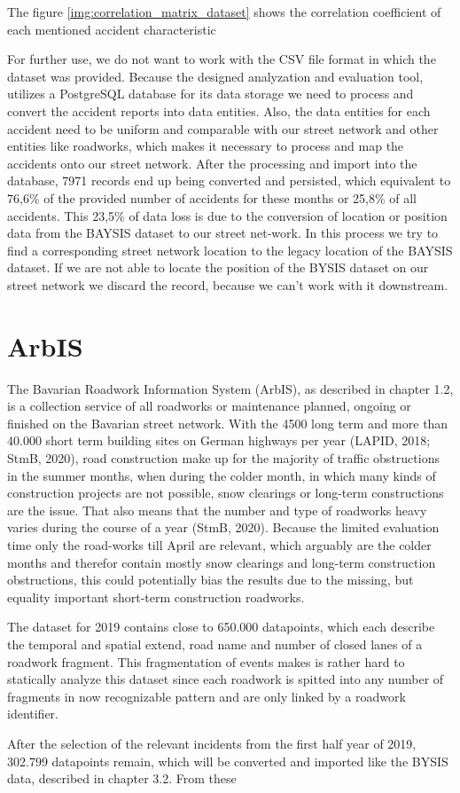 \documentclass[a4paper,12pt]{report}
\begin{document}
The figure \ref{img:correlation_matrix_dataset} shows the correlation coefficient of each mentioned accident characteristic 

For further use, we do not want to work with the CSV file format in which the dataset was provided. Because the designed analyzation and evaluation tool, utilizes a PostgreSQL database for its data storage we need to process and convert the accident reports into data entities. Also, the data entities for each accident need to be uniform and comparable with our street network and other entities like roadworks, which makes it necessary to process and map the accidents onto our street network. After the processing and import into the database, 7971 records end up being converted and persisted, which equivalent to 76,6\% of the provided number of accidents for these months or 25,8\% of all accidents. This 23,5\% of data loss is due to the conversion of location or position data from the BAYSIS dataset to our street net-work. In this process we try to find a corresponding street network location to the legacy location of the BAYSIS dataset. If we are not able to locate the position of the BYSIS dataset on our street network we discard the record, because we can’t work with it downstream. 

\section{ArbIS}

The Bavarian Roadwork Information System (ArbIS), as described in chapter 1.2, is a collection service of all roadworks or maintenance planned, ongoing or finished on the Bavarian street network. With the 4500 long term and more than 40.000 short term building sites on German highways per year (LAPID, 2018; StmB, 2020), road construction make up for the majority of traffic obstructions in the summer months, when during the colder month, in which many kinds of construction projects are not possible, snow clearings or long-term constructions are the issue. That also means that the number and type of roadworks heavy varies during the course of a year (StmB, 2020). Because the limited evaluation time only the road-works till April are relevant, which arguably are the colder months and therefor contain mostly snow clearings and long-term construction obstructions, this could potentially bias the results due to the missing, but equality important short-term construction roadworks.
\par The dataset for 2019 contains close to 650.000 datapoints, which each describe the temporal and spatial extend, road name and number of closed lanes of a roadwork fragment. This fragmentation of events makes is rather hard to statically analyze this dataset since each roadwork is spitted into any number of fragments in now recognizable pattern and are only linked by a roadwork identifier.
\par After the selection of the relevant incidents from the first half year of 2019, 302.799 datapoints remain, which will be converted and imported like the BYSIS data, described in chapter 3.2. From these 
\end{document}
